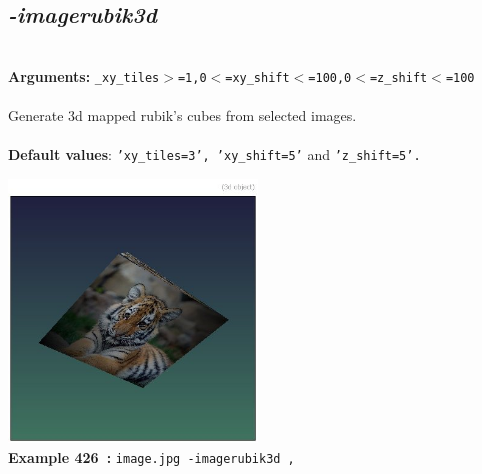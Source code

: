 \documentclass[a4paper,11pt,twoside]{book}
\begin{document}
\subsection{\emph{-imagerubik3d} }\vspace*{-0.5em}
~\\\textbf{Arguments: } 
{\small \texttt{\_xy\_tiles$>$=1,0$<$=xy\_shift$<$=100,0$<$=z\_shift$<$=100}}\\~\\
Generate 3d mapped rubik's cubes from selected images.
~\\~\\\textbf{Default values}: {\small \texttt{'xy\_tiles=3', 'xy\_shift=5'} and \texttt{'z\_shift=5'.}}
\begin{center}\includegraphics[keepaspectratio=true,height=7cm,width=\textwidth]{img/gmic_def426.jpg}\\
{\footnotesize \textbf{Example 426~:} \texttt{image.jpg -imagerubik3d ,}}
\end{center}
\end{document}
